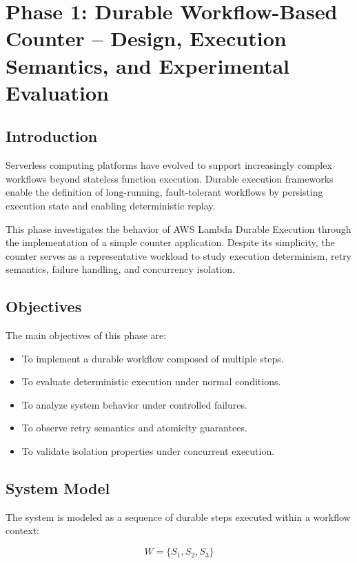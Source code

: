 \section{Phase 1: Durable Workflow-Based Counter -- Design, Execution Semantics, and Experimental Evaluation}

\subsection{Introduction}

Serverless computing platforms have evolved to support increasingly complex workflows beyond stateless function execution. Durable execution frameworks enable the definition of long-running, fault-tolerant workflows by persisting execution state and enabling deterministic replay.

This phase investigates the behavior of AWS Lambda Durable Execution through the implementation of a simple counter application. Despite its simplicity, the counter serves as a representative workload to study execution determinism, retry semantics, failure handling, and concurrency isolation.

\subsection{Objectives}

The main objectives of this phase are:

\begin{itemize}
    \item To implement a durable workflow composed of multiple steps.
    \item To evaluate deterministic execution under normal conditions.
    \item To analyze system behavior under controlled failures.
    \item To observe retry semantics and atomicity guarantees.
    \item To validate isolation properties under concurrent execution.
\end{itemize}

\subsection{System Model}

The system is modeled as a sequence of durable steps executed within a workflow context:

\begin{equation}
W = \{ S_1, S_2, S_3 \}
\end{equation}

